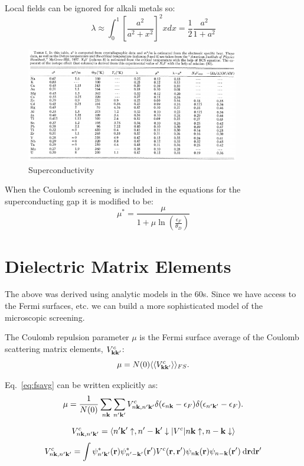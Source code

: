 Local fields can be ignored for alkali metals so:
%
\begin{equation}
\lambda \approx \int_{0}^{1} \left[\frac{a^{2}}{a^{2}+x^{2}}\right]^{2}x dx=\frac{1}{2}\frac{a^{2}}{1+a^{2}}
\end{equation}
%
\begin{figure}
\label{fig:supercond}
\begin{center}
\includegraphics[height=50mm]{./Superconductivity/superconductingparameters.png}
\caption{\small Superconductivity}
\end{center}
\end{figure}
%
When the Coulomb screening is included in the equations for the 
superconducting gap it is modified to be:
%
\begin{equation}
\mu^{*} =  \frac{\mu}{1+ \mu \ln(\frac{\epsilon_{F}}{\theta_{D}})}
\end{equation}
%
\section{Dielectric Matrix Elements}
The above was derived using analytic models in the 60s. Since we have access
to the Fermi surfaces, etc. we can build a more sophisticated model of the
microscopic screening.

The Coulomb repulsion parameter $\mu$ is the Fermi surface average of the Coulomb
scattering matrix elements, $V^{c}_{{\bf k}{\bf k}'}$:
%
\begin{equation}
\label{eq:fsavg}
\mu = N(0) \langle\langle V^{c}_{{\bf k}{\bf k}'} \rangle\rangle_{FS}.
\end{equation}
%

Eq.~\ref{eq:fsavg} can be written explicitly as:
%
\begin{equation}
\mu = \frac{1}{N(0)} \sum_{n{\bf k}}\sum_{n'{\bf k}'}V^{c}_{n{\bf k},n'{\bf k}'}\delta(\epsilon_{n{\bf k}}-\epsilon_{F})\delta(\epsilon_{n'{\bf k}'}-\epsilon_{F}).
\end{equation}
%

%
\begin{equation}
V^{c}_{n{\bf k},n'{\bf k}'} = \langle n'{\bf k}'\uparrow, n'-{\bf k}'\downarrow |V^{c}| n{\bf k}\uparrow, 
n-{\bf k}\downarrow\rangle
\end{equation}
%
\begin{equation}
V^{c}_{n{\bf k},n'{\bf k}'} = \int \psi^{*}_{n'{\bf k}'}({\bf r})\psi^{*}_{n'-{\bf k}'}({\bf r}') V^{c}({\bf r},{\bf r}')
\psi_{n{\bf k}}({\bf r})\psi_{n-{\bf k}}({\bf r}')\:\rm{d}{\bf r}\mathrm{d}{\bf r}'
\end{equation}
%

